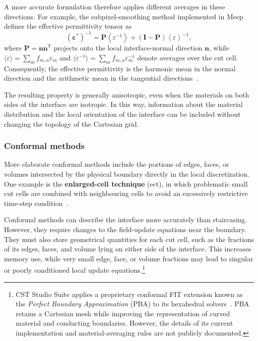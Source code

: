 A more accurate formulation therefore applies different averages in these directions. For example, the subpixel-smoothing method implemented in Meep defines the effective permittivity tensor as
%
\begin{equation}
\left(\boldsymbol{\varepsilon}^{*}\right)^{-1}
=
\mathbf{P}
\left\langle\varepsilon^{-1}\right\rangle
+
\left(\mathbf{I}-\mathbf{P}\right)
\left\langle\varepsilon\right\rangle^{-1},
\label{eq:subpixel_effective_permittivity}
\end{equation}
%
where $\mathbf{P}=\mathbf{n}\mathbf{n}^{\mathsf{T}}$ projects onto the local interface-normal direction $\mathbf{n}$, while $\langle\varepsilon\rangle=\sum_m f_{m,n}\varepsilon_m$ and $\langle\varepsilon^{-1}\rangle=\sum_m f_{m,n}\varepsilon_m^{-1}$ denote averages over the cut cell. Consequently, the effective permittivity is the harmonic mean in the normal direction and the arithmetic mean in the tangential directions~\cite{farjadpourImprovingAccuracySubpixel2006, oskooiAccurateFinitedifferenceTimedomain2009}.

The resulting property is generally anisotropic, even when the materials on both sides of the interface are isotropic. In this way, information about the material distribution and the local orientation of the interface can be included without changing the topology of the Cartesian grid.

\subsubsection{Conformal methods}

More elaborate conformal methods include the portions of edges, faces, or volumes intersected by the physical boundary directly in the local discretization. One example is the \textbf{enlarged-cell technique} (\gls{ect}), in which problematic small cut cells are combined with neighbouring cells to avoid an excessively restrictive time-step condition~\cite{xiao3DEnlargedCell2008}.

Conformal methods can describe the interface more accurately than staircasing. However, they require changes to the field-update equations near the boundary. They must also store geometrical quantities for each cut cell, such as the fractions of its edges, faces, and volume lying on either side of the interface. This increases memory use, while very small edge, face, or volume fractions may lead to singular or poorly conditioned local update equations\cite{zagorodnovConformalFDTDmethodsAvoid2007}.\footnote{CST Studio Suite applies a proprietary conformal FIT extension known as the \emph{Perfect Boundary Approximation} (PBA) to its hexahedral solvers~\cite{Krietenstein:745457}. PBA retains a Cartesian mesh while improving the representation of curved material and conducting boundaries. However, the details of its current implementation and material-averaging rules are not publicly documented.}

